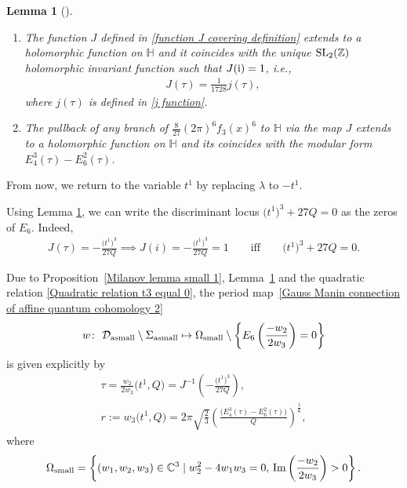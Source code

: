 \documentclass[11pt]{article}
\numberwithin{equation}{section}
\numberwithin{equation}{section}
\newtheorem{Lemma}[Theorem]{Lemma}
\begin{document}
\begin{Lemma}[{\cite{Milanov}}]\label{Milanov lemma small 2}\quad
\begin{enumerate}\itemsep=0pt

\item[$(1)$]
The function $J$ defined in \eqref{function J covering definition} extends to a holomorphic function on $\mathbb{H}$ and it coincides with the unique ${\rm SL}_2(\mathbb{Z})$ holomorphic invariant function such that $J({\rm i})=1$, i.e.,
\begin{gather}\label{J function other normalization}
J(\tau)=\frac{1}{1728}j(\tau),
\end{gather}
where $j(\tau)$ is defined in \eqref{j function}.
\item[$(2)$]
The pullback of any branch of $\frac{8}{27}(2\pi)^6f_3(x)^{6}$ to $\mathbb{H}$ via the map $J$ extends to a holomorphic function on $\mathbb{H}$ and its coincides with the modular form $E_4^3(\tau)-E_6^2(\tau)$.
\end{enumerate}

\end{Lemma}
From now, we return to the variable $t^1$ by replacing $\lambda$ to $-t^1$.

Using Lemma \ref{Milanov lemma small 2}, we can write the discriminant locus $\bigl(t^1\bigr)^3+27Q=0$ as the zeros of $E_6$. Indeed,
\begin{gather*}
J(\tau)=-\frac{\bigl(t^1\bigr)^3}{27Q} \implies J(i)=-\frac{\bigl(t^1\bigr)^3}{27Q}=1 \qquad \text{iff} \qquad \bigl(t^1\bigr)^3+27Q=0.
\end{gather*}

Due to Proposition~\ref{Milanov lemma small 1}, Lemma~\ref{Milanov lemma small 2} and the quadratic relation \eqref{Quadratic relation t3 equal 0}, the period map~\eqref{Gauss Manin connection of affine quantum cohomology 2}
\begin{gather*}
w\colon\ \mathcal{D}_{\rm asmall}\setminus{\Sigma_{\rm asmall}}\mapsto \Omega_{\rm small}\setminus\left\{ E_6\left(\frac{-w_2}{2w_3}\right)=0\right\}
\end{gather*}
 is given explicitly by
\begin{gather}
\tau=\frac{w_2}{2w_3}\bigl(t^1,Q\bigr)=J^{-1}\left( -\frac{\bigl(t^1\bigr)^3}{27Q} \right),\nonumber\\
r:=w_3\bigl(t^1,Q\bigr)=2\pi\sqrt{\frac{2}{3}}\left(\frac{\bigl(E_4^3(\tau)-E_6^2(\tau) \bigr)}{Q}\right)^{\frac{1}{6}},\label{period map functions}
\end{gather}
where
\[%
\Omega_{\rm small}=\left\{ (w_1,w_2,w_3) \in \mathbb{C}^3 \mid w_2^2-4w_1w_3=0,\, \operatorname{Im}\left(\frac{-w_2}{2w_3}\right)> 0\right\}.
\]
\end{document}
